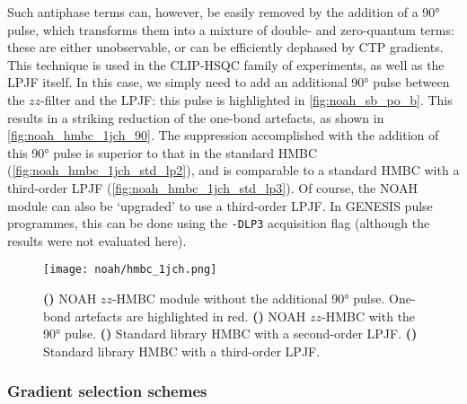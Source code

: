 Such antiphase terms can, however, be easily removed by the addition of a \carbon{} \ang{90} pulse, which transforms them into a mixture of double- and zero-quantum terms: these are either unobservable, or can be efficiently dephased by CTP gradients.
This technique is used in the CLIP-HSQC family of experiments\autocite{Enthart2008JMR,Gyongyosi2021AC}, as well as the LPJF itself.
In this case, we simply need to add an additional \carbon{} \ang{90} pulse between the $zz$-filter and the LPJF: this pulse is highlighted in \cref{fig:noah_sb_po_b}.
This results in a striking reduction of the one-bond artefacts, as shown in \cref{fig:noah_hmbc_1jch_90}.
The suppression accomplished with the addition of this \ang{90} pulse is superior to that in the standard HMBC (\cref{fig:noah_hmbc_1jch_std_lp2}), and is comparable to a standard HMBC with a third-order LPJF (\cref{fig:noah_hmbc_1jch_std_lp3}).
Of course, the NOAH module can also be `upgraded' to use a third-order LPJF.
In GENESIS pulse programmes, this can be done using the \texttt{-DLP3} acquisition flag (although the results were not evaluated here).

\begin{figure}[!ht]
    \centering
    \texttt{[image: noah/hmbc\_1jch.png]}%
    {\label{fig:noah_hmbc_1jch_no90}}%
    {\label{fig:noah_hmbc_1jch_90}}%
    {\label{fig:noah_hmbc_1jch_std_lp2}}%
    {\label{fig:noah_hmbc_1jch_std_lp3}}%
    \caption[Suppression of one-bond artefacts in NOAH HMBC spectra]{
        \textbf{()} NOAH $zz$-HMBC module without the additional \ang{90} pulse.
        One-bond artefacts are highlighted in red.
        \textbf{()} NOAH $zz$-HMBC with the \ang{90} pulse.
        \textbf{()} Standard library HMBC with a second-order LPJF.
        \textbf{()} Standard library HMBC with a third-order LPJF.
    }
    \label{fig:noah_hmbc_1jch}
\end{figure}


\subsubsection{Gradient selection schemes}

